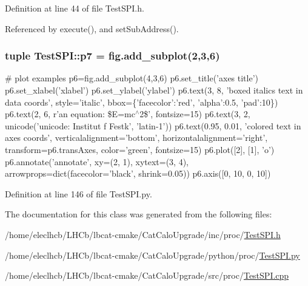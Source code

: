 Definition at line 44 of file TestSPI.h.

Referenced by execute(), and setSubAddress().\hypertarget{classTestSPI_ada4d8e2279a18e5493a04c94da260d5e}{
\subsubsection[{p7}]{\setlength{\rightskip}{0pt plus 5cm}tuple {\bf TestSPI::p7} = fig.add\_\-subplot(2,3,6)}}
\label{classTestSPI_ada4d8e2279a18e5493a04c94da260d5e}


\# plot examples p6=fig.add\_\-subplot(4,3,6) p6.set\_\-title('axes title') p6.set\_\-xlabel('xlabel') p6.set\_\-ylabel('ylabel') p6.text(3, 8, 'boxed italics text in data coords', style='italic', bbox=\{'facecolor':'red', 'alpha':0.5, 'pad':10\}) p6.text(2, 6, r'an equation: \$E=mc$^\wedge$2\$', fontsize=15) p6.text(3, 2, unicode('unicode: Institut f Festk', 'latin-\/1')) p6.text(0.95, 0.01, 'colored text in axes coords', verticalalignment='bottom', horizontalalignment='right', transform=p6.transAxes, color='green', fontsize=15) p6.plot(\mbox{[}2\mbox{]}, \mbox{[}1\mbox{]}, 'o') p6.annotate('annotate', xy=(2, 1), xytext=(3, 4), arrowprops=dict(facecolor='black', shrink=0.05)) p6.axis(\mbox{[}0, 10, 0, 10\mbox{]}) 

Definition at line 146 of file TestSPI.py.

The documentation for this class was generated from the following files:\begin{DoxyCompactItemize}
\item 
/home/eleclhcb/LHCb/lbcat-\/cmake/CatCaloUpgrade/inc/proc/\hyperlink{TestSPI_8h}{TestSPI.h}\item 
/home/eleclhcb/LHCb/lbcat-\/cmake/CatCaloUpgrade/python/proc/\hyperlink{TestSPI_8py}{TestSPI.py}\item 
/home/eleclhcb/LHCb/lbcat-\/cmake/CatCaloUpgrade/src/proc/\hyperlink{TestSPI_8cpp}{TestSPI.cpp}\end{DoxyCompactItemize}
